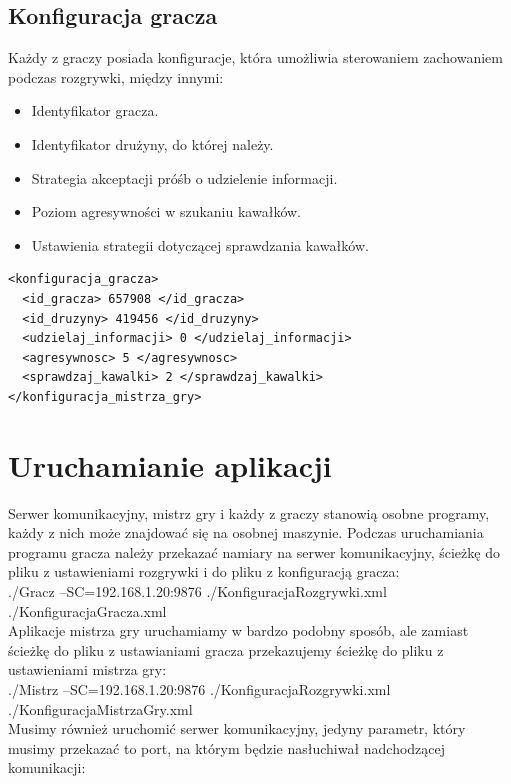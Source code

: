 \documentclass[a4paper]{article}
\begin{document}
\subsection{Konfiguracja gracza}
Każdy z graczy posiada konfiguracje, która umożliwia sterowaniem zachowaniem podczas rozgrywki, między innymi:
  \begin{itemize}
  \item
    Identyfikator gracza. 
  \item
    Identyfikator drużyny, do której należy. 
  \item
    Strategia akceptacji próśb o udzielenie informacji.
  \item
    Poziom agresywności w szukaniu kawałków.
  \item
    Ustawienia strategii dotyczącej sprawdzania kawałków. 
  \end{itemize}
  
 \begin{lstlisting}
<konfiguracja_gracza>
  <id_gracza> 657908 </id_gracza>
  <id_druzyny> 419456 </id_druzyny>
  <udzielaj_informacji> 0 </udzielaj_informacji>
  <agresywnosc> 5 </agresywnosc>
  <sprawdzaj_kawalki> 2 </sprawdzaj_kawalki>
</konfiguracja_mistrza_gry>
\end{lstlisting}
 

\section{Uruchamianie aplikacji}
Serwer komunikacyjny, mistrz gry i każdy z graczy stanowią osobne programy, każdy z nich może znajdować się na osobnej maszynie. Podczas uruchamiania programu gracza należy przekazać namiary na serwer komunikacyjny, ścieżkę do pliku z ustawieniami rozgrywki i do pliku z konfiguracją gracza:\\

./Gracz --SC=192.168.1.20:9876 ./KonfiguracjaRozgrywki.xml ./KonfiguracjaGracza.xml\\

Aplikacje mistrza gry uruchamiamy w bardzo podobny sposób, ale zamiast ścieżkę do pliku z ustawianiami gracza przekazujemy ścieżkę do pliku z ustawieniami mistrza gry:\\

./Mistrz --SC=192.168.1.20:9876 ./KonfiguracjaRozgrywki.xml ./KonfiguracjaMistrzaGry.xml\\

Musimy również uruchomić serwer komunikacyjny, jedyny parametr, który musimy przekazać to port, na którym będzie nasłuchiwał nadchodzącej komunikacji:\\
\end{document}
